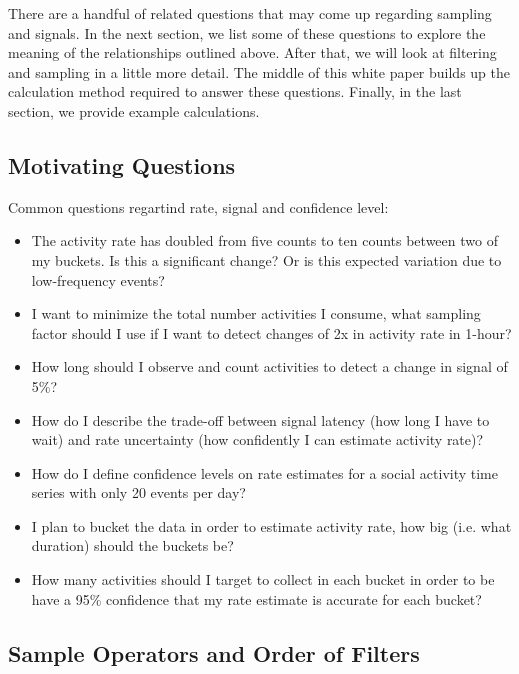 \documentclass{article}
\begin{document}
There are a handful of related questions that may come up regarding sampling and signals.  In the next section, we list some of these questions to explore the meaning of the relationships outlined above. After that, we will look at filtering and sampling in a little more detail.  The middle of this white paper builds up the calculation method required to answer these questions. Finally, in the last section, we provide example calculations.

\subsection{Motivating Questions} 

Common questions regartind rate, signal and confidence level:

\begin{itemize}
	\item The activity rate has doubled from five counts to ten counts between two of my buckets. Is this a significant change? 
	Or is this expected variation due to low-frequency events?
	\item I want to minimize the total number activities I consume, what sampling factor should I use if I want to detect
	changes of 2x in activity rate in 1-hour?
	\item How long should I observe and count activities to detect a change in signal of 5\%?
	\item How do I describe the trade-off between signal latency (how long I have to wait) and rate uncertainty (how 
	confidently I can estimate activity rate)?
	\item How do I define confidence levels on rate estimates for a social activity time series with only 20 events per day?
	\item I plan to bucket the data in order to estimate activity rate, how big (i.e. what duration) should the buckets be? 
	\item How many activities should I target to collect in each bucket in order to be have a 95\% confidence that my 
	rate estimate is accurate for each bucket? 
\end{itemize}

\subsection{Sample Operators and Order of Filters} 
\end{document}
